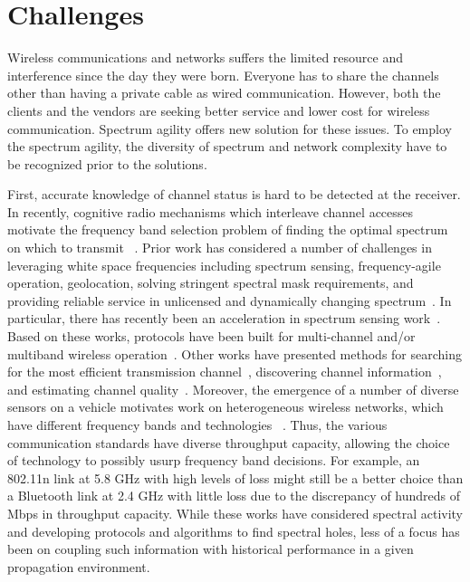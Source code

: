 \section{Challenges}

Wireless communications and networks suffers the limited resource
and interference since the day they were born. Everyone has to
share the channels other than having a private cable as wired 
communication. However, both the clients and the vendors are 
seeking better service and lower cost for wireless communication. 
Spectrum agility offers new solution for these issues. To employ
the spectrum agility, the diversity of spectrum and network 
complexity have to be recognized prior to the solutions.

First, accurate knowledge of channel status is hard to be detected 
at the receiver. In recently, cognitive radio mechanisms which 
interleave channel accesses motivate the frequency band selection 
problem of finding the optimal spectrum on which to transmit
~\cite{ghasemi2008spectrum}. Prior work has considered a number of 
challenges in leveraging white space frequencies including spectrum 
sensing, frequency-agile operation, geolocation, solving stringent 
spectral mask requirements, and providing reliable service in unlicensed 
and dynamically changing spectrum~\cite{shellhammer2009technical}. In 
particular, there has recently been an acceleration in spectrum sensing 
work~\cite{rayanchu2011fluid, kim1996pulse,cabric2004implementation}. 
Based on these works, protocols have been built for multi-channel and/or 
multiband wireless operation~\cite{MOAR,raychaudhuri2003spectrum,sabharwal2007opportunistic}. 
Other works have presented methods for searching for the most efficient 
transmission channel~\cite{mo2005comparison}, discovering channel 
information~\cite{rayanchu2011fluid, sabharwal2007opportunistic}, and 
estimating channel quality~\cite{MOAR}. Moreover, the emergence of a 
number of diverse sensors on a vehicle motivates work on heterogeneous 
wireless networks, which have different frequency bands and technologies
~\cite{hossain2010vehicular}. Thus, the various communication standards 
have diverse throughput capacity, allowing the choice of technology 
to possibly usurp frequency band decisions. For example, an 802.11n 
link at 5.8 GHz with high levels of loss might still be a better choice 
than a Bluetooth link at 2.4 GHz with little loss due to the discrepancy 
of hundreds of Mbps in throughput capacity. While these works have 
considered spectral activity and developing protocols and algorithms to 
find spectral holes, less of a focus has been on coupling such information 
with historical performance in a given propagation environment.

